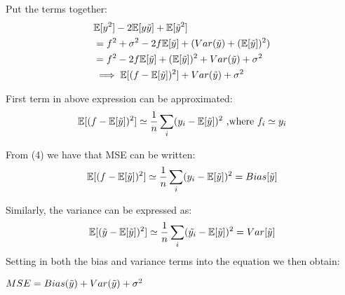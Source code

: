 %
Put the terms together:
\begin{align*}
    & \mathbb{E}[y^2]-2\mathbb{E}[y\Tilde{y}]+\mathbb{E}[\Tilde{y}^2]\\
    & = f^2+\sigma^2-2f\mathbb{E}[\Tilde{y}]+(Var(\Tilde{y})+(\mathbb{E}[\Tilde{y}])^2)\\
    & = f^2-2f\mathbb{E}[\Tilde{y}]+(\mathbb{E}[\Tilde{y}])^2+Var(\Tilde{y})+\sigma^2\\
    & \implies \mathbb{E}[(f-\mathbb{E}[\Tilde{y}])^2]+Var(\Tilde{y})+\sigma^2
\end{align*}

First term in above expression can be approximated:
\begin{equation}
    \mathbb{E}[(f-\mathbb{E}[\Tilde{y}])^2] \simeq \frac{1}{n}\sum_{i}(y_i-\mathbb{E}[\Tilde{y}])^2 \text{ ,where } f_i\simeq y_i
\end{equation}

From (4) we have that MSE can be written:
\begin{equation}
    \mathbb{E}[(f-\mathbb{E}[\Tilde{y}])^2] \simeq \frac{1}{n}\sum_{i}(y_i-\mathbb{E}[\Tilde{y}])^2 = Bias[\Tilde{y}]
\end{equation}

Similarly, the variance can be expressed as:
\begin{align*}
    \mathbb{E}[(\Tilde{y}-\mathbb{E}[\Tilde{y}])^2]\simeq\frac{1}{n}\sum_{i}(\Tilde{y_i}-\mathbb{E}[\Tilde{y}])^2 = Var[\Tilde{y}]
\end{align*}
Setting in both the bias and variance terms into the equation we then obtain:

$MSE=Bias(\Tilde{y})+Var(\Tilde{y})+\sigma^2$





